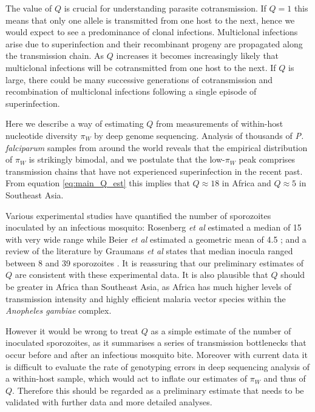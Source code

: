 \documentclass[_main.tex]{subfiles}
\begin{document}
The value of $Q$ is crucial for understanding parasite cotransmission.  If $Q=1$ this means that only one allele is transmitted from one host to the next, hence we would expect to see a predominance of clonal infections.  Multiclonal infections arise due to superinfection and their recombinant progeny are propagated along the transmission chain.  As $Q$ increases it becomes increasingly likely that multiclonal infections will be cotransmitted from one host to the next.  If $Q$ is large, there could be many successive generations of cotransmission and recombination of multiclonal infections following a single episode of superinfection.

Here we describe a way of estimating $Q$ from measurements of within-host nucleotide diversity $\pi_W$ by deep genome sequencing.  Analysis of thousands of \textit{P. falciparum} samples from around the world reveals that the empirical distribution of $\pi_W$ is strikingly bimodal, and we postulate that the low-$\pi_W$ peak comprises transmission chains that have not experienced superinfection in the recent past.  From equation \ref{eq:main_Q_est} this implies that $Q \approx 18$ in Africa and $Q \approx 5$ in Southeast Asia.

Various experimental studies have quantified the number of sporozoites inoculated by an infectious mosquito: Rosenberg \textit{et al} estimated a median of 15 with very wide range \cite{Rosenberg1990} while Beier \textit{et al} estimated a geometric mean of 4.5 \cite{Beier1991}; and a review of the literature by Graumans \textit{et al} states that median inocula ranged between 8 and 39 sporozoites \cite{Graumans2020}.   It is reassuring that our preliminary estimates of $Q$ are consistent with these experimental data.  It is also plausible that $Q$ should be greater in Africa than Southeast Asia, as Africa has much higher levels of transmission intensity and highly efficient malaria vector species within the \textit{Anopheles gambiae} complex.  

However it would be wrong to treat $Q$ as a simple estimate of the number of inoculated sporozoites, as it summarises a series of transmission bottlenecks that occur before and after an infectious mosquito bite.  Moreover with current data it is difficult to evaluate the rate of genotyping errors in deep sequencing analysis of a within-host sample, which would act to inflate our estimates of $\pi_W$ and thus of $Q$.  Therefore this should be regarded as a preliminary estimate that needs to be validated with further data and more detailed analyses.
\end{document}
